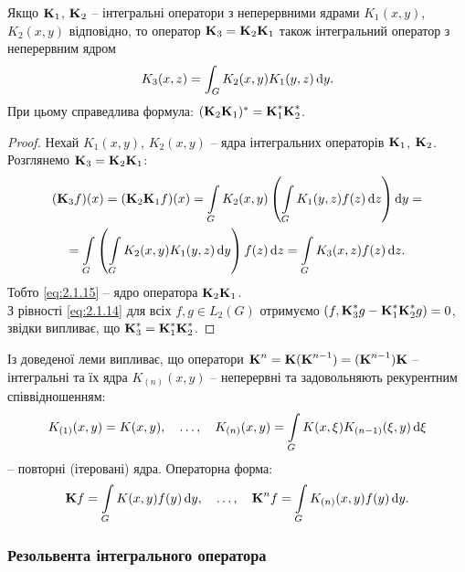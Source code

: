 \begin{lemma}
	Якщо $\bf{K}_1$, $\bf{K}_2$ -- інтегральні оператори з неперервними ядрами $K_1(x, y)$, $K_2(x, y)$ відповідно, то оператор $\bf{K}_3 = \bf{K}_2 \bf{K}_1$ також інтегральний оператор з неперервним ядром
	\begin{equation}
		\label{eq:2.1.15}
		K_3(x, z) = \int_G K_2(x, y) K_1(y, z) \diff y.
	\end{equation}
	При цьому справедлива формула: $(\bf{K}_2\bf{K}_1)^* = \bf{K}_1^* \bf{K}_2^*$.
\end{lemma}
\begin{proof}
	Нехай $K_1(x, y)$, $K_2(x, y)$ -- ядра інтегральних операторів $\bf{K}_1$, $\bf{K}_2$. Розглянемо $\bf{K}_3 = \bf{K}_2 \bf{K}_1$:
	\begin{multline*}
		(\bf{K}_3 f)(x) = (\bf{K}_2\bf{K}_1f)(x) = \Int_G K_2(x, y) \left( \Int_G K_1(y, z) f(z) \diff z \right) \diff y = \\
		= \Int_G \left( \Int_G K_2(x, y) K_1(y, z) \diff y\right) f(z) \diff z = \Int_G K_3(x, z) f(z) \diff z.
	\end{multline*}
	Тобто \eqref{eq:2.1.15} -- ядро оператора $\bf{K}_2\bf{K}_1$. \\

	З рівності \eqref{eq:2.1.14} для всіх $f, g \in L_2(G)$ отримуємо $(f, \bf{K}_3^*g - \bf{K}_1^* \bf{K}_2^* g) = 0$, звідки випливає, що $\bf{K}_3^* = \bf{K}_1^* \bf{K}_2^*$.
\end{proof}

Із доведеної леми випливає, що оператори $\bf{K}^n = \bf{K} (\bf{K}^{n - 1}) = (\bf{K}^{n - 1})\bf{K}$ -- інтегральні та їх ядра $K_{(n)}(x, y)$ -- неперервні та задовольняють рекурентним співвідношенням:
\begin{equation}
	\label{eq:2.1.16}
	K_{(1)}(x, y) = K(x, y), \quad \ldots, \quad K_{(n)}(x, y) = \Int_G K(x, \xi) K_{(n - 1)}(\xi, y) \diff \xi
\end{equation}
-- повторні (ітеровані) ядра. Операторна форма:
\begin{equation}
	\label{eq:2.1.17}
	\bf{K}f = \Int_G K(x, y) f(y) \diff y, \quad \ldots, \quad \bf{K}^n f = \Int_G K_{(n)}(x, y)f(y) \diff y.
\end{equation}

\subsubsection{Резольвента інтегрального оператора}

